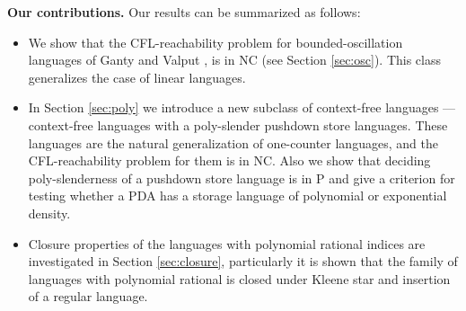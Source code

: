 \documentclass[smallextended]{svjour3}       %
\begin{document}
\textbf{Our contributions.} Our results can be summarized as follows:
\begin{itemize}
\item We show that the CFL-reachability problem for bounded-oscillation languages of Ganty and Valput \cite{BoundOsc}, is in NC (see Section \ref{sec:osc}). This class generalizes the case of linear languages. 
\item In Section \ref{sec:poly} we introduce a new subclass of context-free languages --- context-free languages with a poly-slender pushdown store languages. These languages are the natural generalization of one-counter languages, and the CFL-reachability problem for them is in NC. Also we show that deciding poly-slenderness of a pushdown store language is in P and give a criterion for testing whether a PDA has a storage language of polynomial or exponential density.  
\item Closure properties of the languages with polynomial rational indices are investigated in Section \ref{sec:closure}, particularly it is shown that the family of languages with polynomial rational is closed under Kleene star and insertion of a regular language.
\end{itemize}




\end{document}
